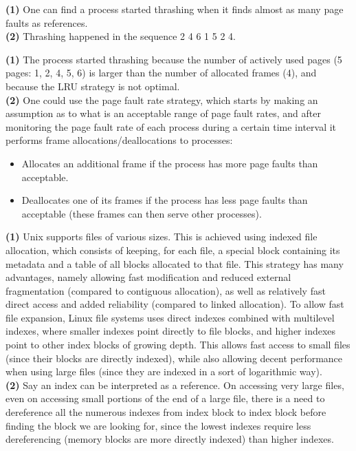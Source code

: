 \documentclass{sope}
\begin{document}
{
\textbf{(1)} One can find a process started thrashing when it finds almost as many page faults as references.\\
\textbf{(2)} Thrashing happened in the sequence 2 4 6 1 5 2 4.

\textbf{(1)} The process started thrashing because the number of actively used pages (5 pages: 1, 2, 4, 5, 6) is larger than the number of allocated frames (4), and because the LRU strategy is not optimal.\\
\textbf{(2)} One could use the page fault rate strategy, which starts by making an assumption as to what is an acceptable range of page fault rates, and after monitoring the page fault rate of each process during a certain time interval it performs frame allocations/deallocations to processes:
\begin{itemize}
    \item Allocates an additional frame if the process has more page faults than acceptable.
    \item Deallocates one of its frames if the process has less page faults than acceptable (these frames can then serve other processes).
\end{itemize}


\textbf{(1)} Unix supports files of various sizes. This is achieved using indexed file allocation, which consists of keeping, for each file, a special block containing its metadata and a table of all blocks allocated to that file. This strategy has many advantages, namely allowing fast modification and reduced external fragmentation (compared to contiguous allocation), as well as relatively fast direct access and added reliability (compared to linked allocation). To allow fast file expansion, Linux file systems uses direct indexes combined with multilevel indexes, where smaller indexes point directly to file blocks, and higher indexes point to other index blocks of growing depth. This allows fast access to small files (since their blocks are directly indexed), while also allowing decent performance when using large files (since they are indexed in a sort of logarithmic way).\\
\textbf{(2)} Say an index can be interpreted as a reference. On accessing very large files, even on accessing small portions of the end of a large file, there is a need to dereference all the numerous indexes from index block to index block before finding the block we are looking for, since the lowest indexes require less dereferencing (memory blocks are more directly indexed) than higher indexes.

}
\end{document}
